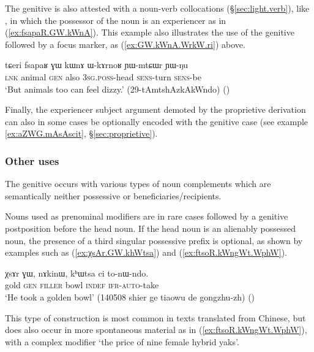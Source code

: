 The genitive is also attested with a noun-verb collocations (§\ref{sec:light.verb}), like , in which the possessor  of the noun is an experiencer as in (\ref{ex:fsapaR.GW.kWnA}). This example also illustrates the use of the genitive followed by a focus marker, as (\ref{ex:GW.kWnA.WrkW.ri}) above.

\begin{exe}
\ex \label{ex:fsapaR.GW.kWnA}
\gll tɕeri fsapaʁ ɣɯ kɯnɤ ɯ-kɤrnoʁ ɲɯ-mtɕɯr ɲɯ-ŋu \\
\textsc{lnk} animal \textsc{gen} also \textsc{3sg}.\textsc{poss}-head \textsc{sens}-turn \textsc{sens}-be \\
\glt `But animals too can feel dizzy.' (29-tAmtshAzkAkWndo)
()
\end{exe}

Finally, the experiencer subject argument demoted by the proprietive derivation can also in some cases be optionally encoded with the genitive case (see example \ref{ex:aZWG.mAsAscit}, §\ref{sec:proprietive}).

\subsubsection{Other uses} \label{sec:gen.other}
The genitive  occurs with various types of noun complements which are semantically neither possessive or beneficiaries/recipients. 

Nouns used as prenominal modifiers are in rare cases followed by a genitive postposition before the head noun. If the head noun is an alienably possessed noun, the presence of a third singular possessive prefix  is optional, as shown by examples such as (\ref{ex:χsAr.GW.khWtsa}) and (\ref{ex:ftsoR.kWngWt.WphW}). 

\begin{exe}
\ex \label{ex:χsAr.GW.khWtsa}
\gll  χsɤr ɣɯ, nɤkinɯ, kʰɯtsa ci to-nɯ-ndo. \\
gold \textsc{gen} \textsc{filler} bowl \textsc{indef} \textsc{ifr}-\textsc{auto}-take \\
\glt `He took a golden bowl' (140508 shier ge tiaowu de gongzhu-zh)
()
\end{exe}

This type of construction is most common in texts translated from Chinese, but does also occur in more spontaneous material as in (\ref{ex:ftsoR.kWngWt.WphW}), with a complex modifier  `the price of nine female hybrid yaks'.

